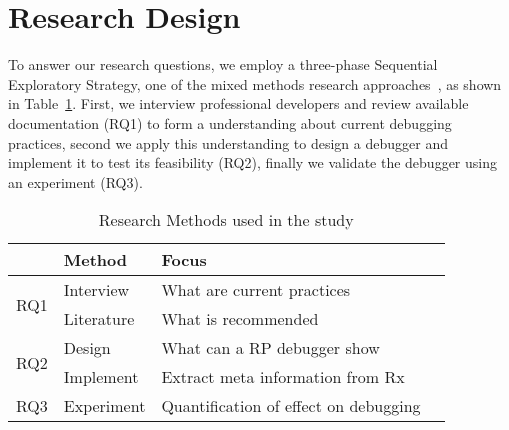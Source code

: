 \section{Research Design}
To answer our research questions, we employ a three-phase Sequential Exploratory Strategy, one of the mixed methods research approaches~\cite{creswell2013research,hanson2005mixed}, as shown in Table~\ref{research-methods}.
First, we interview professional developers and review available documentation (RQ1) to form a understanding about current debugging practices,
second we apply this understanding to design a debugger and implement it to test its feasibility (RQ2),
finally we validate the debugger using an experiment (RQ3).

\begin{table}[t]
\centering
\begin{tabularx}{\columnwidth}{lllX}
\hline
\textbf{}            & \textbf{Method} & \textbf{Focus}                               \\ \hline
\multirow{2}{*}{RQ1} & Interview       & What are current practices                   \\ 
                     & Literature      & What is recommended                          \\
\multirow{2}{*}{RQ2} & Design          & What can a RP debugger show                  \\ 
                     & Implement       & Extract meta information from Rx             \\ 
RQ3                  & Experiment      & Quantification of effect on debugging        \\ \hline
\end{tabularx}
\caption{Research Methods used in the study}
\label{research-methods}
\end{table}

\iffalse
\todo{
qualitive data
quantitive
design, implemented, tested with real developers
buzz words: mixed methods, grounded theory
}
\fi